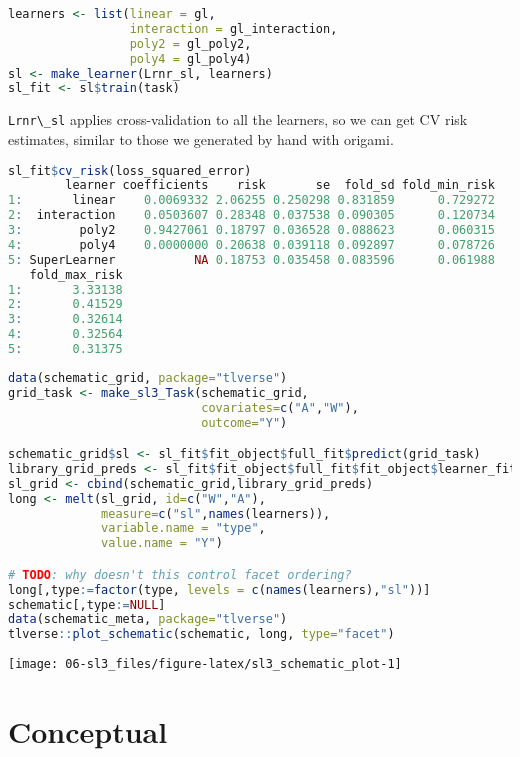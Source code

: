 \documentclass[
  12pt, krantz2,
]{krantz}
\newcommand{\passthrough}[1]{#1}
\theoremstyle{definition}
\theoremstyle{definition}
\theoremstyle{definition}
\newcommand{\1}{\mathbbm{1}}
\begin{document}
\begin{lstlisting}[language=R]
learners <- list(linear = gl, 
                 interaction = gl_interaction, 
                 poly2 = gl_poly2,
                 poly4 = gl_poly4)
sl <- make_learner(Lrnr_sl, learners)
sl_fit <- sl$train(task)
\end{lstlisting}

\passthrough{\lstinline!Lrnr\_sl!} applies cross-validation to all the learners, so we can get
CV risk estimates, similar to those we generated by hand with origami.

\begin{lstlisting}[language=R]
sl_fit$cv_risk(loss_squared_error)
        learner coefficients    risk       se  fold_sd fold_min_risk
1:       linear    0.0069332 2.06255 0.250298 0.831859      0.729272
2:  interaction    0.0503607 0.28348 0.037538 0.090305      0.120734
3:        poly2    0.9427061 0.18797 0.036528 0.088623      0.060315
4:        poly4    0.0000000 0.20638 0.039118 0.092897      0.078726
5: SuperLearner           NA 0.18753 0.035458 0.083596      0.061988
   fold_max_risk
1:       3.33138
2:       0.41529
3:       0.32614
4:       0.32564
5:       0.31375
\end{lstlisting}

\begin{lstlisting}[language=R]
data(schematic_grid, package="tlverse")
grid_task <- make_sl3_Task(schematic_grid, 
                           covariates=c("A","W"),
                           outcome="Y")

schematic_grid$sl <- sl_fit$fit_object$full_fit$predict(grid_task)
library_grid_preds <- sl_fit$fit_object$full_fit$fit_object$learner_fits[[1]]$predict(grid_task)
sl_grid <- cbind(schematic_grid,library_grid_preds)
long <- melt(sl_grid, id=c("W","A"),
             measure=c("sl",names(learners)),
             variable.name = "type",
             value.name = "Y")

# TODO: why doesn't this control facet ordering?
long[,type:=factor(type, levels = c(names(learners),"sl"))]
schematic[,type:=NULL]
data(schematic_meta, package="tlverse")
tlverse::plot_schematic(schematic, long, type="facet")
\end{lstlisting}

\begin{center}\texttt{[image: 06-sl3\_files/figure-latex/sl3\_schematic\_plot-1]} \end{center}

\hypertarget{conceptual-1}{%
\section{Conceptual}\label{conceptual-1}}
\end{document}
